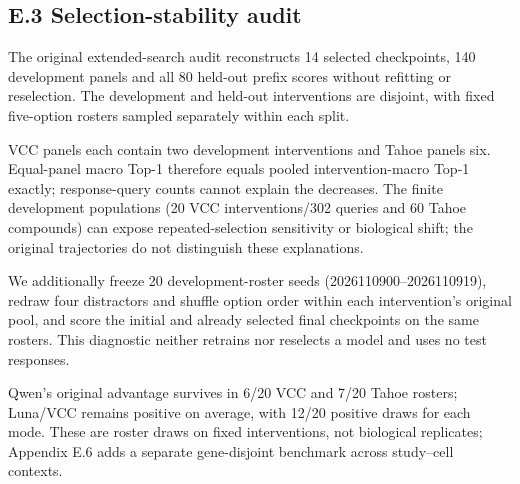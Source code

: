 \subsection*{E.3 Selection-stability audit}
The original extended-search audit reconstructs 14 selected checkpoints, 140 development panels and all 80 held-out prefix scores without refitting or reselection. The development and held-out interventions are disjoint, with fixed five-option rosters sampled separately within each split.



VCC panels each contain two development interventions and Tahoe panels six. Equal-panel macro Top-1 therefore equals pooled intervention-macro Top-1 exactly; response-query counts cannot explain the decreases. The finite development populations (20 VCC interventions/302 queries and 60 Tahoe compounds) can expose repeated-selection sensitivity or biological shift; the original trajectories do not distinguish these explanations.

We additionally freeze 20 development-roster seeds (2026110900--2026110919), redraw four distractors and shuffle option order within each intervention's original pool, and score the initial and already selected final checkpoints on the same rosters. This diagnostic neither retrains nor reselects a model and uses no test responses.



Qwen's original advantage survives in 6/20 VCC and 7/20 Tahoe rosters; Luna/VCC remains positive on average, with 12/20 positive draws for each mode. These are roster draws on fixed interventions, not biological replicates; Appendix E.6 adds a separate gene-disjoint benchmark across study--cell contexts.

